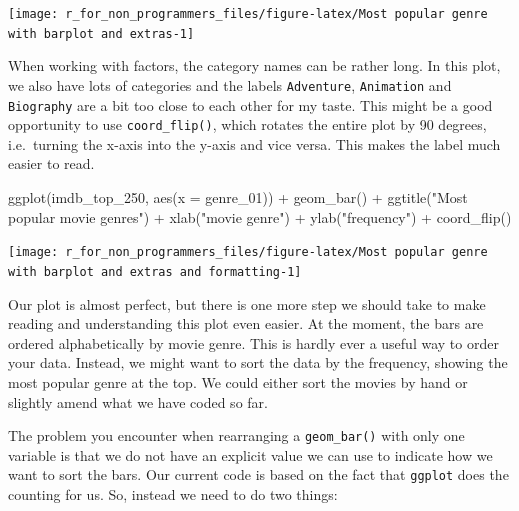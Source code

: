 \documentclass[
]{book}
\newenvironment{Shaded}{\begin{snugshade}}{\end{snugshade}}
\newcommand{\AttributeTok}[1]{\textcolor[rgb]{0.77,0.63,0.00}{#1}}
\newcommand{\FunctionTok}[1]{\textcolor[rgb]{0.00,0.00,0.00}{#1}}
\newcommand{\NormalTok}[1]{#1}
\newcommand{\SpecialCharTok}[1]{\textcolor[rgb]{0.00,0.00,0.00}{#1}}
\newcommand{\StringTok}[1]{\textcolor[rgb]{0.31,0.60,0.02}{#1}}
\begin{document}
\begin{center}\texttt{[image: r\_for\_non\_programmers\_files/figure-latex/Most popular genre with barplot and extras-1]} \end{center}

When working with factors, the category names can be rather long. In this plot, we also have lots of categories and the labels \texttt{Adventure}, \texttt{Animation} and \texttt{Biography} are a bit too close to each other for my taste. This might be a good opportunity to use \texttt{coord\_flip()}, which rotates the entire plot by 90 degrees, i.e.~turning the x-axis into the y-axis and vice versa. This makes the label much easier to read.

\begin{Shaded}
\begin{Highlighting}[]
\FunctionTok{ggplot}\NormalTok{(imdb\_top\_250, }\FunctionTok{aes}\NormalTok{(}\AttributeTok{x =}\NormalTok{ genre\_01)) }\SpecialCharTok{+}
  \FunctionTok{geom\_bar}\NormalTok{() }\SpecialCharTok{+}
  \FunctionTok{ggtitle}\NormalTok{(}\StringTok{"Most popular movie genres"}\NormalTok{) }\SpecialCharTok{+}
  \FunctionTok{xlab}\NormalTok{(}\StringTok{"movie genre"}\NormalTok{) }\SpecialCharTok{+}
  \FunctionTok{ylab}\NormalTok{(}\StringTok{"frequency"}\NormalTok{) }\SpecialCharTok{+}
  \FunctionTok{coord\_flip}\NormalTok{()}
\end{Highlighting}
\end{Shaded}

\begin{center}\texttt{[image: r\_for\_non\_programmers\_files/figure-latex/Most popular genre with barplot and extras and formatting-1]} \end{center}

Our plot is almost perfect, but there is one more step we should take to make reading and understanding this plot even easier. At the moment, the bars are ordered alphabetically by movie genre. This is hardly ever a useful way to order your data. Instead, we might want to sort the data by the frequency, showing the most popular genre at the top. We could either sort the movies by hand or slightly amend what we have coded so far.

The problem you encounter when rearranging a \texttt{geom\_bar()} with only one variable is that we do not have an explicit value we can use to indicate how we want to sort the bars. Our current code is based on the fact that \texttt{ggplot} does the counting for us. So, instead we need to do two things:
\end{document}
